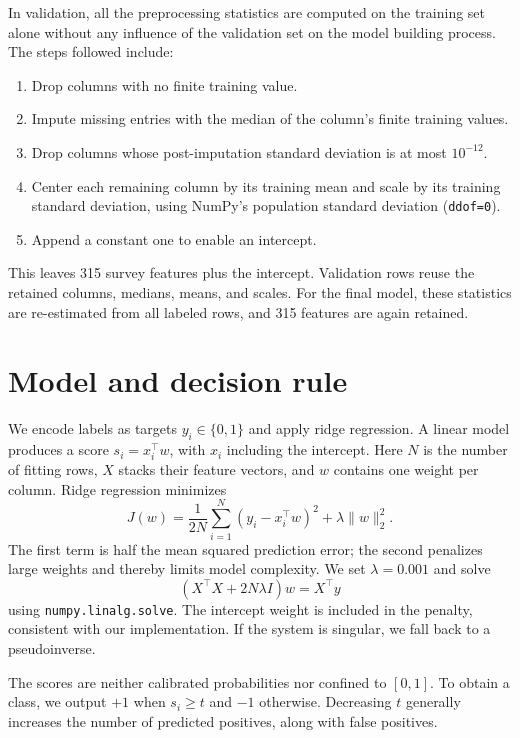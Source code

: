 \documentclass[10pt,conference,compsocconf]{IEEEtran}
\begin{document}
In validation, all the preprocessing statistics are computed on the training set
alone without any influence of the validation set on the model building process.
The steps followed include:
\begin{enumerate}
\item Drop columns with no finite training value.
\item Impute missing entries with the median of the column's finite training values.
\item Drop columns whose post-imputation standard deviation is at most $10^{-12}$.
\item Center each remaining column by its training mean and scale by its training
standard deviation, using NumPy's population standard deviation (\texttt{ddof=0}).
\item Append a constant one to enable an intercept.
\end{enumerate}
This leaves 315 survey features plus the intercept. Validation rows reuse the
retained columns, medians, means, and scales. For the final model, these
statistics are re-estimated from all labeled rows, and 315 features are again
retained.

\section{Model and decision rule}
We encode labels as targets $y_i\in\{0,1\}$ and apply ridge regression. A linear
model produces a score $s_i=x_i^\top w$, with $x_i$ including the intercept.
Here $N$ is the number of fitting rows, $X$ stacks their feature vectors,
and $w$ contains one weight per column. Ridge regression minimizes
\begin{equation}
J(w)=\frac{1}{2N}\sum_{i=1}^{N}(y_i-x_i^\top w)^2
      +\lambda\|w\|_2^2.
\end{equation}
The first term is half the mean squared prediction error; the second penalizes large
weights and thereby limits model complexity. We set $\lambda=0.001$ and solve
\begin{equation}
(X^\top X+2N\lambda I)w=X^\top y
\end{equation}
using \texttt{numpy.linalg.solve}. The intercept weight is included in the
penalty, consistent with our implementation. If the system is singular, we fall
back to a pseudoinverse.

The scores are neither calibrated probabilities nor confined to $[0,1]$. To
obtain a class, we output $+1$ when $s_i\geq t$ and $-1$ otherwise. Decreasing
$t$ generally increases the number of predicted positives, along with false
positives.
\end{document}
